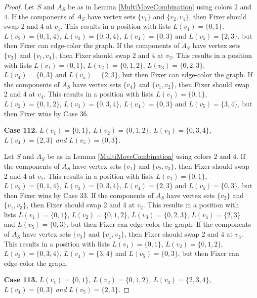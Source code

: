 \documentclass[12pt]{amsart}
\theoremstyle{plain}
\theoremstyle{definition}
\theoremstyle{remark}
\begin{document}
\begin{proof}
Let $S$ and $A_S$ be as in Lemma \ref{MultiMoveCombination} using colors $2$ and $4$. If the components of $A_S$ have vertex sets $\{v_1\}$ and $\{v_2, v_4\}$, then Fixer should swap 2 and 4 at $v_1$. This results in a position with lists $L(v_1) = \{0, 1\}$, $L(v_2) = \{0, 1, 4\}$, $L(v_3) = \{0, 3, 4\}$, $L(v_4) = \{0, 3\}$ and $L(v_5) = \{2, 3\}$, but then Fixer can edge-color the graph.
If the components of $A_S$ have vertex sets $\{v_2\}$ and $\{v_1, v_4\}$, then Fixer should swap 2 and 4 at $v_2$. This results in a position with lists $L(v_1) = \{0, 1\}$, $L(v_2) = \{0, 1, 2\}$, $L(v_3) = \{0, 2, 3\}$, $L(v_4) = \{0, 3\}$ and $L(v_5) = \{2, 3\}$, but then Fixer can edge-color the graph.
If the components of $A_S$ have vertex sets $\{v_4\}$ and $\{v_1, v_2\}$, then Fixer should swap 2 and 4 at $v_4$. This results in a position with lists $L(v_1) = \{0, 1\}$, $L(v_2) = \{0, 1, 2\}$, $L(v_3) = \{0, 3, 4\}$, $L(v_4) = \{0, 3\}$ and $L(v_5) = \{3, 4\}$, but then Fixer wins by Case 36.

\noindent\textbf{Case 112.  }\textit{$L(v_1) = \{0, 1\}$, $L(v_2) = \{0, 1, 2\}$, $L(v_3) = \{0, 3, 4\}$, $L(v_4) = \{2, 3\}$ and $L(v_5) = \{0, 3\}$.}

Let $S$ and $A_S$ be as in Lemma \ref{MultiMoveCombination} using colors $2$ and $4$. If the components of $A_S$ have vertex sets $\{v_1\}$ and $\{v_2, v_3\}$, then Fixer should swap 2 and 4 at $v_1$. This results in a position with lists $L(v_1) = \{0, 1\}$, $L(v_2) = \{0, 1, 4\}$, $L(v_3) = \{0, 3, 4\}$, $L(v_4) = \{2, 3\}$ and $L(v_5) = \{0, 3\}$, but then Fixer wins by Case 33.
If the components of $A_S$ have vertex sets $\{v_2\}$ and $\{v_1, v_3\}$, then Fixer should swap 2 and 4 at $v_2$. This results in a position with lists $L(v_1) = \{0, 1\}$, $L(v_2) = \{0, 1, 2\}$, $L(v_3) = \{0, 2, 3\}$, $L(v_4) = \{2, 3\}$ and $L(v_5) = \{0, 3\}$, but then Fixer can edge-color the graph.
If the components of $A_S$ have vertex sets $\{v_3\}$ and $\{v_1, v_2\}$, then Fixer should swap 2 and 4 at $v_3$. This results in a position with lists $L(v_1) = \{0, 1\}$, $L(v_2) = \{0, 1, 2\}$, $L(v_3) = \{0, 3, 4\}$, $L(v_4) = \{3, 4\}$ and $L(v_5) = \{0, 3\}$, but then Fixer can edge-color the graph.

\noindent\textbf{Case 113.  }\textit{$L(v_1) = \{0, 1\}$, $L(v_2) = \{0, 1, 2\}$, $L(v_3) = \{2, 3, 4\}$, $L(v_4) = \{0, 3\}$ and $L(v_5) = \{2, 3\}$.}


\end{proof}
\end{document}
